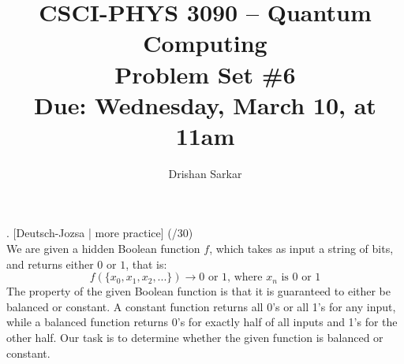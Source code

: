 \documentclass[11pt]{article}
\begin{document}
\date{}
\author{Drishan Sarkar}
\title{CSCI-PHYS 3090 -- Quantum Computing\\ Problem Set \#6 \\  Due: Wednesday, March 10, at 11am}
\maketitle
 
. [Deutsch-Jozsa | more practice] (/30)
\\
We are given a hidden Boolean function $f$, which takes as input a string of bits, and returns either $0$ or $1$, that is: 
$$f(\{x_0,x_1,x_2,...\}) \xrightarrow{} 0 \text{ or } 1 \text{, where } x_n \text{ is 0 or 1}$$
The property of the given Boolean function is that it is guaranteed to either be balanced or constant. A constant function returns all 0's or all 1's for any input, while a balanced function returns 0's for exactly half of all inputs and 1's for the other half. Our task is to determine whether the given function is balanced or constant. 
\end{document}
